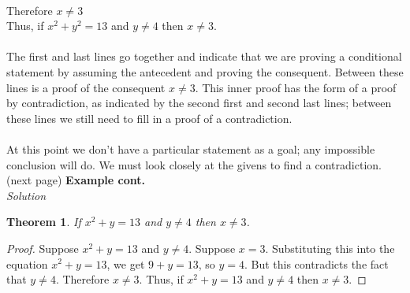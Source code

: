 \documentclass{report}
\newtheorem*{theorem}{Theorem}
\theoremstyle{definition}
\begin{document}
\indent\indent{}\\
\indent\indent Therefore $x\neq3$\\
\indent Thus, if $x^2+y^2=13$ and $y\neq4$ then $x\neq3$.\\
\vspace{1mm}\\
The first and last lines go together and indicate that we are proving a conditional statement by assuming the antecedent and proving the consequent. Between these lines is a proof of
the consequent $x\neq3$. This inner proof has the form of a proof by contradiction, as indicated by the second first and second last lines; between these lines we still need
to fill in a proof of a contradiction.\\
\vspace{1mm}\\
At this point we don't have a particular statement as a goal; any impossible conclusion will do. We must look closely at the givens to find a contradiction.\\ 
(next page)\newpage
\noindent\textbf{Example cont.}\\
\textit{Solution}
\begin{theorem}
If $x^2+y=13$ and $y\neq4$ then $x\neq3$.
\end{theorem}
\begin{proof}
Suppose $x^2+y=13$ and $y\neq4$. Suppose $x=3$. Substituting this into the equation $x^2+y=13$, we get $9+y=13$, so $y=4$. But this contradicts the fact that $y\neq4$. Therefore $x\neq 3$. 
Thus, if $x^2+y=13$ and $y\neq 4$ then $x\neq 3$.
\end{proof}
\end{document}
